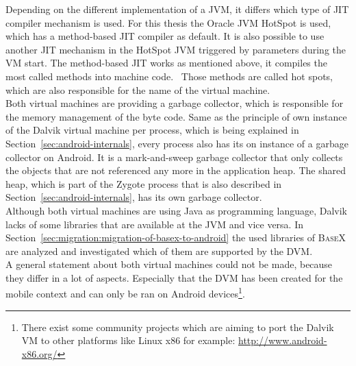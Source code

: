 Depending on the different implementation of a JVM, it differs which type of JIT compiler mechanism is used.
For this thesis the Oracle JVM HotSpot is used, which has a method-based JIT compiler as default.
It is also possible to use another JIT mechanism in the HotSpot JVM triggered by parameters during the VM start.
The method-based JIT works as mentioned above, it compiles the most called methods into machine code.~\cite{kotzmann2008design}
Those methods are called hot spots, which are also responsible for the name of the virtual machine.~\cite{paleczny2001java}
\\
Both virtual machines are providing a garbage collector, which is responsible for the memory management of the byte code.
Same as the principle of own instance of the Dalvik virtual machine per process, which is being explained in Section~\ref{sec:android-internals}, every process also has its on instance of a garbage collector on Android.
It is a mark-and-sweep garbage collector that only collects the objects that are not referenced any more in the application heap.
The shared heap, which is part of the Zygote process that is also described in Section~\ref{sec:android-internals}, has its own garbage collector.~\cite{maia2010evaluating}
\\
Although both virtual machines are using Java as programming language, Dalvik lacks of some libraries that are available at the JVM and vice versa.
In Section~\ref{sec:migration:migration-of-basex-to-android} the used libraries of \textsc{BaseX} are analyzed and investigated which of them are supported by the DVM.\\
A general statement about both virtual machines could not be made, because they differ in a lot of aspects.
Especially that the DVM has been created for the mobile context and can only be ran on Android devices\footnote{There exist some community projects which are aiming to port the Dalvik VM to other platforms like Linux x86 for example: \url{http://www.android-x86.org/}}.



